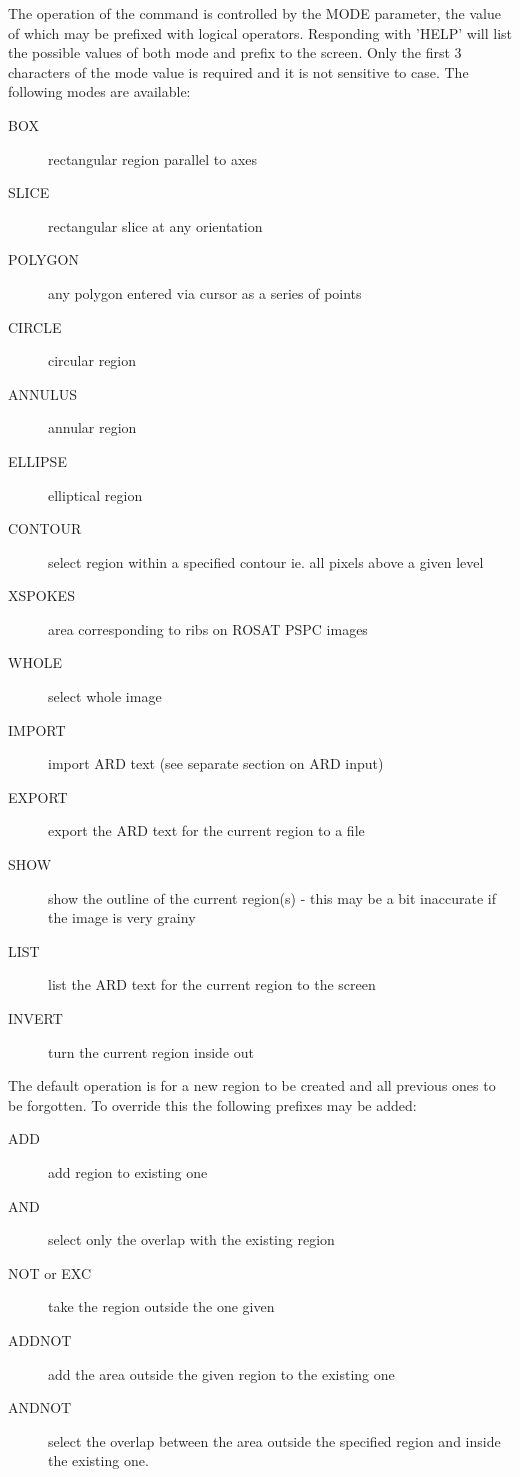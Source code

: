 \documentclass{book}
\renewcommand{\_}{{\tt\char'137}}     %
\begin{document}
The operation of the command is controlled by the MODE parameter, the
value of which may be prefixed with logical operators. Responding
with 'HELP' will list the possible values of both mode and prefix
to the screen. Only the first 3 characters of the mode value is
required and it is not sensitive to case. The following modes are
available:
 
 
\begin{description}
\item[BOX]
rectangular region parallel to axes
\item[SLICE]
rectangular slice at any orientation
\item[POLYGON]
any polygon entered via cursor as a series of points
\item[CIRCLE]
circular region
\item[ANNULUS]
annular region
\item[ELLIPSE]
elliptical region
\item[CONTOUR]
select region within a specified contour ie. all
pixels above a given level
\item[XSPOKES]
area corresponding to ribs on ROSAT PSPC images
\item[WHOLE]
select whole image
\item[IMPORT]
import ARD text (see separate section on ARD input)
\item[EXPORT]
export the ARD text for the current region to a file
\item[SHOW]
show the outline of the current region(s) - this may be
a bit inaccurate if the image is very grainy
\item[LIST]
list the ARD text for the current region to the screen
\item[INVERT]
turn the current region inside out
\end{description}
The default operation is for a new region to be created and all
previous ones to be forgotten. To override this the following
prefixes may be added:
 
 
\begin{description}
\item[ADD]
add region to existing one
\item[AND]
select only the overlap with the existing region
\item[NOT or EXC]
take the region outside the one given
\item[ADDNOT]
add the area outside the given region to the existing one
\item[ANDNOT]
select the overlap between the area outside the specified
region and inside the existing one.
\end{description}
\end{document}
